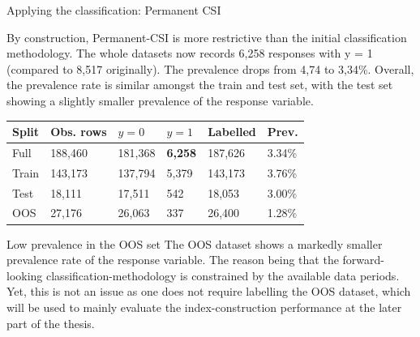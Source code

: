 \documentclass[10pt]{beamer}\usepackage[]{graphicx}\usepackage[table]{xcolor}
\begin{document}

\begin{frame}{Applying the classification: Permanent CSI}

By construction, Permanent-CSI is more restrictive than the initial classification methodology.
The whole datasets now records 6,258 responses with y = 1 (compared to 8,517 originally). The prevalence
drops from 4,74 to 3,34\%. Overall, the prevalence rate is similar amongst the train and test set,
with the test set showing a slightly smaller prevalence of the response variable.


\vspace{0.2em}
\begin{table}[ht]
\centering
\scriptsize
\setlength{\tabcolsep}{4.4pt}
\begin{tabular}{L{1.7cm}R{1.25cm}R{1.1cm}R{1.1cm}R{1.25cm}R{1.0cm}}
\toprule
Split & Obs. rows & $y=0$ & $y=1$ & Labelled & Prev. \\
\midrule
Full & 188,460 & 181,368 & \textbf{6,258} & 187,626 & 3.34\% \\
Train & 143,173 & 137,794 & 5,379 & 143,173 & 3.76\% \\
Test & 18,111 & 17,511 & 542 & 18,053 & 3.00\% \\
OOS & 27,176 & 26,063 & 337 & 26,400 & 1.28\% \\
\bottomrule
\end{tabular}
\end{table}

\begin{alertblock}{Low prevalence in the OOS set}
\scriptsize
The OOS dataset shows a markedly smaller prevalence rate of the response variable. The reason
being that the forward-looking classification-methodology is constrained by the available data periods.
Yet, this is not an issue as one does not require labelling the OOS dataset, which will be used
to mainly evaluate the index-construction performance at the later part of the thesis.
\end{alertblock}

\end{frame}

\end{document}
